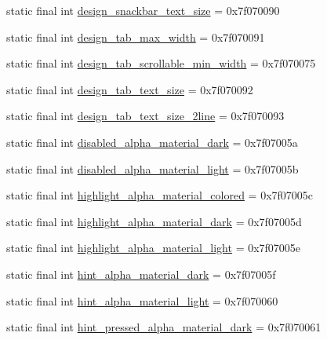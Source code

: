 \begin{CompactItemize}
\item 
static final int \hyperlink{classandroid_1_1support_1_1v4_1_1_r_1_1dimen_8274ab49bfa754200cc58a040be43e0c}{design\_\-snackbar\_\-text\_\-size} = 0x7f070090
\item 
static final int \hyperlink{classandroid_1_1support_1_1v4_1_1_r_1_1dimen_23b633fe8750c3f85592e35434a07dc3}{design\_\-tab\_\-max\_\-width} = 0x7f070091
\item 
static final int \hyperlink{classandroid_1_1support_1_1v4_1_1_r_1_1dimen_0c1438b65eb4c8c50fb0f18756d268ab}{design\_\-tab\_\-scrollable\_\-min\_\-width} = 0x7f070075
\item 
static final int \hyperlink{classandroid_1_1support_1_1v4_1_1_r_1_1dimen_da37874864240943985d1aa78b864c60}{design\_\-tab\_\-text\_\-size} = 0x7f070092
\item 
static final int \hyperlink{classandroid_1_1support_1_1v4_1_1_r_1_1dimen_84b218df6a91e1ce3f7acdb64595701e}{design\_\-tab\_\-text\_\-size\_\-2line} = 0x7f070093
\item 
static final int \hyperlink{classandroid_1_1support_1_1v4_1_1_r_1_1dimen_ed25dd2f6bce81371ccea442f5008f1f}{disabled\_\-alpha\_\-material\_\-dark} = 0x7f07005a
\item 
static final int \hyperlink{classandroid_1_1support_1_1v4_1_1_r_1_1dimen_0fcc27073e5f40b0b94b1fa2fd6d1f4f}{disabled\_\-alpha\_\-material\_\-light} = 0x7f07005b
\item 
static final int \hyperlink{classandroid_1_1support_1_1v4_1_1_r_1_1dimen_d5f23b76a1e66ed3d2c36aba1b72c050}{highlight\_\-alpha\_\-material\_\-colored} = 0x7f07005c
\item 
static final int \hyperlink{classandroid_1_1support_1_1v4_1_1_r_1_1dimen_1e944f8fda607fded8d29bccbe4c9ff5}{highlight\_\-alpha\_\-material\_\-dark} = 0x7f07005d
\item 
static final int \hyperlink{classandroid_1_1support_1_1v4_1_1_r_1_1dimen_ff7bf3618960764e81aba13736de6d5b}{highlight\_\-alpha\_\-material\_\-light} = 0x7f07005e
\item 
static final int \hyperlink{classandroid_1_1support_1_1v4_1_1_r_1_1dimen_a98d690f6eee063f405f28efae48fc73}{hint\_\-alpha\_\-material\_\-dark} = 0x7f07005f
\item 
static final int \hyperlink{classandroid_1_1support_1_1v4_1_1_r_1_1dimen_54d1555495c15a349c0d5780e8cc7333}{hint\_\-alpha\_\-material\_\-light} = 0x7f070060
\item 
static final int \hyperlink{classandroid_1_1support_1_1v4_1_1_r_1_1dimen_cfae87195f182a587c20c210b36f89bb}{hint\_\-pressed\_\-alpha\_\-material\_\-dark} = 0x7f070061

\end{CompactItemize}
